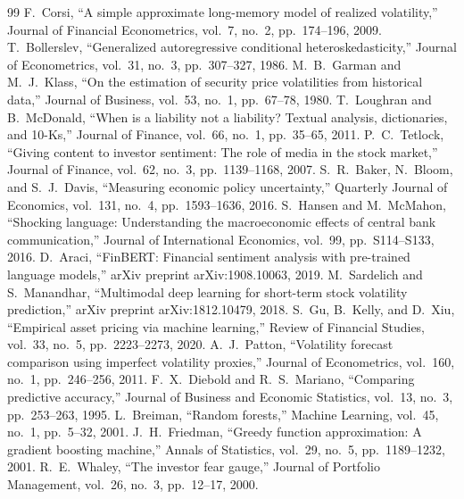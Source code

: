 \documentclass[10pt,twocolumn]{article}
\begin{document}
\begin{thebibliography}{99}\small
{} F.\ Corsi, ``A simple approximate long-memory model of realized volatility,'' Journal of Financial Econometrics, vol.\ 7, no.\ 2, pp.\ 174--196, 2009.
 T.\ Bollerslev, ``Generalized autoregressive conditional heteroskedasticity,'' Journal of Econometrics, vol.\ 31, no.\ 3, pp.\ 307--327, 1986.
 M.\ B.\ Garman and M.\ J.\ Klass, ``On the estimation of security price volatilities from historical data,'' Journal of Business, vol.\ 53, no.\ 1, pp.\ 67--78, 1980.
 T.\ Loughran and B.\ McDonald, ``When is a liability not a liability? Textual analysis, dictionaries, and 10-Ks,'' Journal of Finance, vol.\ 66, no.\ 1, pp.\ 35--65, 2011.
 P.\ C.\ Tetlock, ``Giving content to investor sentiment: The role of media in the stock market,'' Journal of Finance, vol.\ 62, no.\ 3, pp.\ 1139--1168, 2007.
 S.\ R.\ Baker, N.\ Bloom, and S.\ J.\ Davis, ``Measuring economic policy uncertainty,'' Quarterly Journal of Economics, vol.\ 131, no.\ 4, pp.\ 1593--1636, 2016.
 S.\ Hansen and M.\ McMahon, ``Shocking language: Understanding the macroeconomic effects of central bank communication,'' Journal of International Economics, vol.\ 99, pp.\ S114--S133, 2016.
 D.\ Araci, ``FinBERT: Financial sentiment analysis with pre-trained language models,'' arXiv preprint arXiv:1908.10063, 2019.
 M.\ Sardelich and S.\ Manandhar, ``Multimodal deep learning for short-term stock volatility prediction,'' arXiv preprint arXiv:1812.10479, 2018.
 S.\ Gu, B.\ Kelly, and D.\ Xiu, ``Empirical asset pricing via machine learning,'' Review of Financial Studies, vol.\ 33, no.\ 5, pp.\ 2223--2273, 2020.
 A.\ J.\ Patton, ``Volatility forecast comparison using imperfect volatility proxies,'' Journal of Econometrics, vol.\ 160, no.\ 1, pp.\ 246--256, 2011.
 F.\ X.\ Diebold and R.\ S.\ Mariano, ``Comparing predictive accuracy,'' Journal of Business and Economic Statistics, vol.\ 13, no.\ 3, pp.\ 253--263, 1995.
 L.\ Breiman, ``Random forests,'' Machine Learning, vol.\ 45, no.\ 1, pp.\ 5--32, 2001.
 J.\ H.\ Friedman, ``Greedy function approximation: A gradient boosting machine,'' Annals of Statistics, vol.\ 29, no.\ 5, pp.\ 1189--1232, 2001.
 R.\ E.\ Whaley, ``The investor fear gauge,'' Journal of Portfolio Management, vol.\ 26, no.\ 3, pp.\ 12--17, 2000.
\end{thebibliography}
\end{document}

